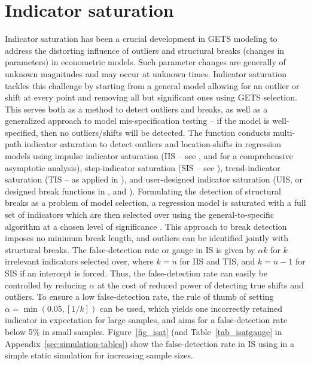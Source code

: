 \documentclass[article,nojss]{jss}
\begin{document}
\section{Indicator saturation}
\label{sec:indicator:saturation}

Indicator saturation has been a crucial development in GETS modeling
to address the distorting influence of outliers and structural breaks
(changes in parameters) in econometric models. Such parameter changes
are generally of unknown magnitudes and may occur at unknown
times. Indicator saturation tackles this challenge by starting from a
general model allowing for an outlier or shift at every point and
removing all but significant ones using GETS selection. This serves
both as a method to detect outliers and breaks, as well as a
generalized approach to model mis-specification testing -- if the
model is well-specified, then no outliers/shifts will be detected. The
function  conducts multi-path indicator saturation to
detect outliers and location-shifts in regression models using impulse
indicator saturation (IIS -- see \citealt{HendryJohansenSantos2007},
and \citealt{johansen2016asymptotic} for a comprehensive asymptotic
analysis), step-indicator saturation (SIS -- see
\citealt{castle2015detecting}), trend-indicator saturation (TIS -- as
applied in \citealt{pretis2015testing}), and user-designed indicator
saturation (UIS, or designed break functions in \citealt{pretis_volc16},
and \citealt{schneider2017}). Formulating the detection of structural
breaks as a problem of model selection, a regression model is
saturated with a full set of indicators which are then selected over
using the general-to-specific  algorithm at a chosen level
of significance .  This approach to break detection
imposes no minimum break length, and outliers can be identified
jointly with structural breaks. The false-detection rate or gauge in
IS is given by $\alpha k$ for $k$ irrelevant indicators selected over,
where $k=n$ for IIS and TIS, and $k=n-1$ for SIS if an intercept is
forced. Thus, the false-detection rate can easily be controlled by
reducing $\alpha$ at the cost of reduced power of detecting true
shifts and outliers. To ensure a low false-detection rate, the rule of
thumb of setting $\alpha=\min(0.05,[1/k])$ can be used, which yields
one incorrectly retained indicator in expectation for large samples,
and aims for a false-detection rate below 5\% in small
samples. Figure~\ref{fig_isat} (and Table~\ref{tab_isatgauge} in
Appendix~\ref{sec:simulation-tables}) show the false-detection rate in IS using  in a
simple static simulation for increasing sample sizes.
\end{document}
